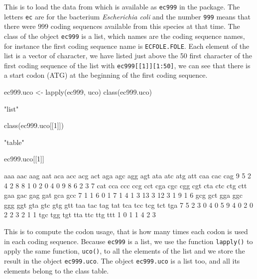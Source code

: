 \documentclass{article}
\begin{document}
This is to load the data from \cite{lobrygautier} which is available as \texttt{ec999}
in the \seqinr{} package. The letters \texttt{ec} are for the bacterium 
\textit{Escherichia coli} and the number \texttt{999} means that there were
$999$ coding sequences available from this species at that time. The class of the
object \texttt{ec999} is a list, which names are the coding sequence names, for instance
the first coding sequence name is 
\texttt{ECFOLE.FOLE}.
Each element of the list is a vector of character, we have listed just above the 50 first
character of the first coding sequence of the list with \texttt{ec999[[1]][1:50]}, we
can see that there is a start codon (ATG) at the beginning of the first coding sequence.

\begin{Schunk}
\begin{Sinput}
 ec999.uco <- lapply(ec999, uco)
 class(ec999.uco)
\end{Sinput}
\begin{Soutput}
[1] "list"
\end{Soutput}
\begin{Sinput}
 class(ec999.uco[[1]])
\end{Sinput}
\begin{Soutput}
[1] "table"
\end{Soutput}
\begin{Sinput}
 ec999.uco[[1]]
\end{Sinput}
\begin{Soutput}
aaa aac aag aat aca acc acg act aga agc agg agt ata atc atg att caa cac cag 
  9   5   2   4   2   8   8   1   0   2   0   4   0   9   8   6   2   3   7 
cat cca ccc ccg cct cga cgc cgg cgt cta ctc ctg ctt gaa gac gag gat gca gcc 
  7   1   1   6   0   1   7   1   4   1   3  13   3  12   3   1   9   1   6 
gcg gct gga ggc ggg ggt gta gtc gtg gtt taa tac tag tat tca tcc tcg tct tga 
  7   5   2   3   0   4   0   5   9   4   0   2   0   2   2   3   2   1   1 
tgc tgg tgt tta ttc ttg ttt 
  1   0   1   1   4   2   3 
\end{Soutput}
\end{Schunk}

This is to compute the codon usage, that is how many times each codon is used
in each coding sequence. Because \texttt{ec999} is a list, we use the function
\texttt{lapply()} to apply the same function, \texttt{uco()}, to all the
elements of the list and we store the result in the object \texttt{ec999.uco}.
The object \texttt{ec999.uco} is a list too, and all its elements belong to
the class table.
\end{document}
